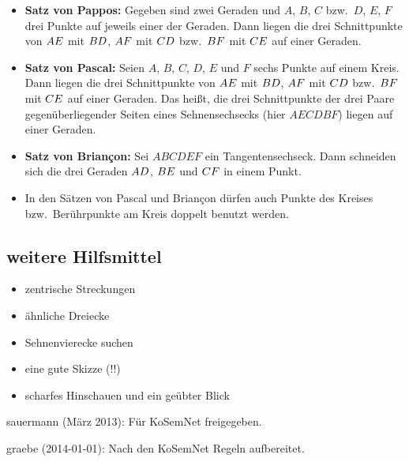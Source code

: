 \documentclass[11pt,a4paper]{article}
\begin{document}
\begin{itemize}
\item \textbf{Satz von Pappos:} Gegeben sind zwei Geraden und $A$, $B$, $C$
  bzw.\ $D$, $E$, $F$ drei Punkte auf jeweils einer der Geraden. Dann liegen
  die drei Schnittpunkte von ${\mathnormal{AE}}$ mit ${\mathnormal{BD}}$, ${\mathnormal{AF}}$ mit
  ${\mathnormal{CD}}$ bzw.\ ${\mathnormal{BF}}$ mit ${\mathnormal{CE}}$ auf einer Geraden.
\item \textbf{Satz von Pascal:} Seien $A$, $B$, $C$, $D$, $E$ und $F$ sechs
  Punkte auf einem Kreis. Dann liegen die drei Schnittpunkte von ${\mathnormal{AE}}$
  mit ${\mathnormal{BD}}$, ${\mathnormal{AF}}$ mit ${\mathnormal{CD}}$ bzw.\ ${\mathnormal{BF}}$ mit
  ${\mathnormal{CE}}$ auf einer Geraden. Das heißt, die drei Schnittpunkte der drei
  Paare gegenüberliegender Seiten eines Sehnensechsecks (hier $AECDBF$) liegen
  auf einer Geraden.
\item \textbf{Satz von Briançon:} Sei $ABCDEF$ ein Tangentensechseck. Dann
  schneiden sich die drei Geraden ${\mathnormal{AD}}$, ${\mathnormal{BE}}$ und ${\mathnormal{CF}}$
  in einem Punkt.
\item In den Sätzen von Pascal und Briançon dürfen auch Punkte des Kreises
  bzw.\ Berührpunkte am Kreis doppelt benutzt werden.
\end{itemize}

\subsection*{weitere Hilfsmittel}
\begin{itemize}
\item zentrische Streckungen
\item ähnliche Dreiecke
\item Sehnenvierecke suchen
\item eine gute Skizze (!!)
\item scharfes Hinschauen und ein geübter Blick
\end{itemize}

\begin{attribution}
sauermann (März 2013): Für KoSemNet freigegeben.

graebe (2014-01-01): Nach den KoSemNet Regeln aufbereitet.
\end{attribution}
\end{document}
